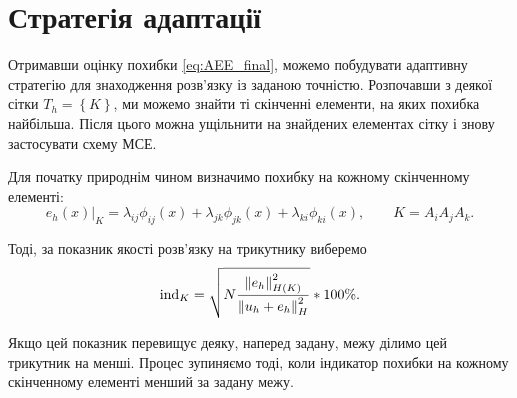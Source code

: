 
\section{Стратегія адаптації}

Отримавши оцінку похибки \eqref{eq:AEE_final}, можемо побудувати адаптивну стратегію для знаходження розв'язку із заданою точністю.
Розпочавши з деякої сітки $T_h =  \left\{ K \right\}$, ми можемо знайти ті скінченні елементи, на яких похибка найбільша.
Після цього можна ущільнити на знайдених елементах сітку і знову застосувати схему МСЕ.

Для початку природнім чином визначимо похибку на кожному скінченному елементі:
%
\newcommand{\error}[1]{\lambda_{#1} \phi_{#1}(x)}
\begin{equation}\label{eq:error_element}
	e_h(x)\bigg|_K = \error{ij}+\error{jk}+\error{ki}, \qquad K = A_iA_jA_k.
\end{equation}

Тоді, за показник якості розв'язку на трикутнику виберемо
%
\begin{equation}\label{eq:error_indicator}
	\text{ind}_K = \sqrt{N \frac
			{\left\lVert e_h\right\rVert^2_{H(K)}}
			{\left\lVert u_h+e_h\right\rVert^2_H}
	}*100\%.
\end{equation}

Якщо цей показник перевищує деяку, наперед задану, межу ділимо цей трикутник на менші.
Процес зупиняємо тоді, коли індикатор похибки на кожному скінченному елементі менший за задану межу.

\undef{\error}
